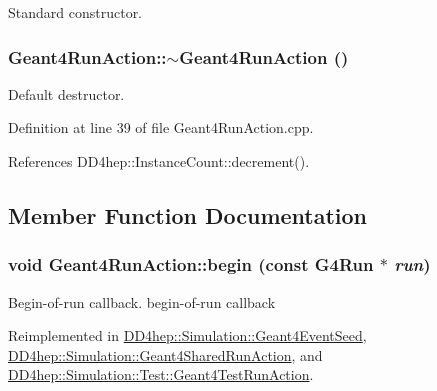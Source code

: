 Standard constructor. \hypertarget{class_d_d4hep_1_1_simulation_1_1_geant4_run_action_ac4db0a811956b595cfba64e2a210e290}{
\subsubsection[{$\sim$Geant4RunAction}]{\setlength{\rightskip}{0pt plus 5cm}Geant4RunAction::$\sim$Geant4RunAction ()}}
\label{class_d_d4hep_1_1_simulation_1_1_geant4_run_action_ac4db0a811956b595cfba64e2a210e290}


Default destructor. 

Definition at line 39 of file Geant4RunAction.cpp.

References DD4hep::InstanceCount::decrement().

\subsection{Member Function Documentation}
\hypertarget{class_d_d4hep_1_1_simulation_1_1_geant4_run_action_aeea4684e5d27e039b26734c3dbf3f65b}{
\subsubsection[{begin}]{\setlength{\rightskip}{0pt plus 5cm}void Geant4RunAction::begin (const G4Run $\ast$ {\em run})}}
\label{class_d_d4hep_1_1_simulation_1_1_geant4_run_action_aeea4684e5d27e039b26734c3dbf3f65b}


Begin-\/of-\/run callback. begin-\/of-\/run callback 

Reimplemented in \hyperlink{class_d_d4hep_1_1_simulation_1_1_geant4_event_seed_a297ed6d4c7366df16c151f31bee46028}{DD4hep::Simulation::Geant4EventSeed}, \hyperlink{class_d_d4hep_1_1_simulation_1_1_geant4_shared_run_action_a8206dc20bbe8ace921f4e97c7159872a}{DD4hep::Simulation::Geant4SharedRunAction}, and \hyperlink{class_d_d4hep_1_1_simulation_1_1_test_1_1_geant4_test_run_action_a1df121c6a80d42e72c898e7303d5c64e}{DD4hep::Simulation::Test::Geant4TestRunAction}.

